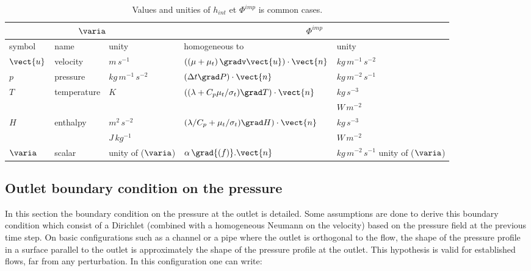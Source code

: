 \begin{table}
\begin{center}
\begin{tabular}{||l|l|l||l|l||}
\hline
\multicolumn{3}{||c||}{$\varia$} & \multicolumn{2}{c||}{$\Phi^{imp}$} \\
\hline
symbol     & name                & unity         & homogeneous to             & unity                                     \\
\hline
$\vect{u}$ & velocity            & $m\,s^{-1}$                &$\left( (\mu+\mu_t)\,\gradv \vect{u} \right)\cdot \vect{n}$  & $kg\,m^{-1}\,s^{-2} $       \\
$p$           & pressure           & $kg\,m^{-1}\,s^{-2}$ &$\left( \Delta t \grad P \right) \cdot \vect{n}$          & $kg\,m^{-2}\,s^{-1}$                        \\
$T$           & temperature     & $K$                              &$\left( (\lambda+C_p\mu_t/\sigma_t)\grad T\right) \cdot \vect{n} $ &$kg\,s^{-3}$ \\
                 &                         &                                     &                                                                                                              &$W\,m^{-2}$ \\       
$H$          & enthalpy           & $m^{2}\,s^{-2}$          &$\left( \lambda/C_p+\mu_t/\sigma_t) \grad H \right) \cdot \vect{n}$&$kg\,s^{-3}$ \\
                 &                         & $J\,kg^{-1}$               &                                                                                                               & $W\,m^{-2}$  \\
$\varia$   & scalar               & unity of ($\varia$)       &$\alpha\,\grad{(f)}.\vect{n}$              & $kg\,m^{-2}\,s^{-1}$ unity of ($\varia$)       \\
\hline
\end{tabular}
\end{center}
\caption{Values and unities of $h_{int}$ et $\Phi^{imp}$  is common cases.}\label{tab:hint_phi_condli}
\end{table}

\subsection{Outlet boundary condition on the pressure}\label{Base_Condli_Sortie_Pression}

In this section the boundary condition on the pressure at the outlet is detailed. Some
assumptions are done to derive this boundary condition which consist of a Dirichlet
(combined with a homogeneous Neumann on the velocity) based on the pressure field
at the previous time step.
On basic configurations such as a channel or a pipe where the outlet is orthogonal 
to the flow, the shape of the pressure profile in a surface parallel to the outlet is
approximately the shape of the pressure profile at the outlet. This hypothesis 
is valid for established flows, far from any perturbation. In this configuration
one can write:

